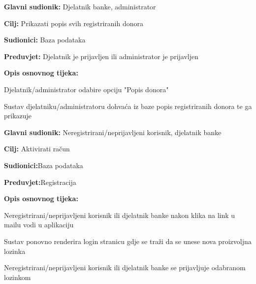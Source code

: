 \noindent {}
					\begin{packed_item}
	
						\item \textbf{Glavni sudionik: }Djelatnik banke, administrator
						\item \textbf{Cilj:} Prikazati popis svih registriranih donora
						\item \textbf{Sudionici:} Baza podataka
						\item \textbf{Preduvjet:} Djelatnik je prijavljen ili administrator je prijavljen
						\item \textbf{Opis osnovnog tijeka:}
						
						\item[] \begin{packed_enum}
	
							\item Djelatnik/administrator odabire opciju "Popis donora"
							\item Sustav djelatniku/administratoru dohvaća iz baze popis registriranih donora te ga prikazuje
						\end{packed_enum}

					\end{packed_item}



\noindent {}
\begin{packed_item}
	
	\item \textbf{Glavni sudionik: } {Neregistrirani/neprijavljeni korisnik, djelatnik banke}
	\item  \textbf{Cilj:} {Aktivirati račun}
	\item  \textbf{Sudionici:}{Baza podataka} 
	\item  \textbf{Preduvjet:}{Registracija}
	\item  \textbf{Opis osnovnog tijeka:}
	
	\item[] \begin{packed_enum}
		
		\item {Neregistrirani/neprijavljeni korisnik ili  djelatnik banke nakon klika na link u mailu vodi u aplikaciju}
		\item {Sustav ponovno renderira login stranicu gdje se traži da se unese nova proizvoljna lozinka} 
		\item {Neregistrirani/neprijavljeni korisnik ili  djelatnik banke se prijavljuje odabranom lozinkom}
	\end{packed_enum}
	
\end{packed_item}
\eject


